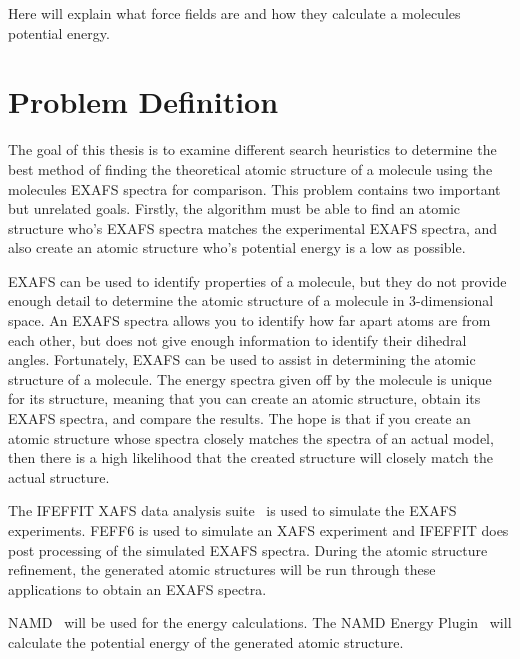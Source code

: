 Here will explain what force fields are and how they calculate a molecules potential energy.

\section{Problem Definition}

The goal of this thesis is to examine different search heuristics to determine the best method of finding the theoretical atomic structure of a molecule using the molecules EXAFS spectra for comparison. This problem contains two important but unrelated goals. Firstly, the algorithm must be able to find an atomic structure who's EXAFS spectra matches the experimental EXAFS spectra, and also create an atomic structure who's potential energy is a low as possible.

EXAFS can be used to identify properties of a molecule, but they do not provide enough detail to determine the atomic structure of a molecule in 3-dimensional space. An EXAFS spectra allows you to identify how far apart atoms are from each other, but does not give enough information to identify their dihedral angles. Fortunately, EXAFS can be used to assist in determining the atomic structure of a molecule. The energy spectra given off by the molecule is unique for its structure, meaning that you can create an atomic structure, obtain its EXAFS spectra, and compare the results. The hope is that if you create an atomic structure whose spectra closely matches the spectra of an actual model, then there is a high likelihood that the created structure will closely match the actual structure.

The IFEFFIT XAFS data analysis suite~\cite{ifeffit} is used to simulate the EXAFS experiments. FEFF6 is used to simulate an XAFS experiment and IFEFFIT does post processing of the simulated EXAFS spectra. During the atomic structure refinement, the generated atomic structures will be run through these applications to obtain an EXAFS spectra.

NAMD~\cite{namd} will be used for the energy calculations. The NAMD Energy Plugin~\cite{namdEnergy}  will calculate the potential energy of the generated atomic structure.